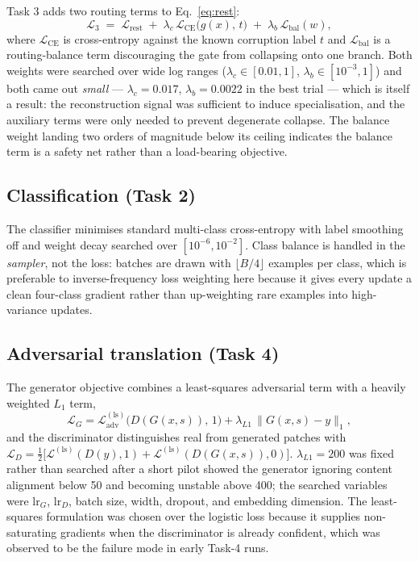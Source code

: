 \documentclass[journal]{IEEEtran}
\begin{document}
Task 3 adds two routing terms to Eq.~\eqref{eq:rest}:
\begin{equation}
\mathcal{L}_3 \;=\; \mathcal{L}_{\text{rest}} \;+\; \lambda_c\,\mathcal{L}_{\text{CE}}\!\big(g(x),\, t\big) \;+\; \lambda_b\,\mathcal{L}_{\text{bal}}(w),
\label{eq:task3}
\end{equation}
where $\mathcal{L}_{\text{CE}}$ is cross-entropy against the known corruption label $t$ and $\mathcal{L}_{\text{bal}}$ is a routing-balance term discouraging the gate from collapsing onto one branch. Both weights were searched over wide log ranges ($\lambda_c\in[0.01,1]$, $\lambda_b\in[10^{-3},1]$) and both came out \emph{small} --- $\lambda_c=0.017$, $\lambda_b=0.0022$ in the best trial --- which is itself a result: the reconstruction signal was sufficient to induce specialisation, and the auxiliary terms were only needed to prevent degenerate collapse. The balance weight landing two orders of magnitude below its ceiling indicates the balance term is a safety net rather than a load-bearing objective.

\subsection{Classification (Task 2)}

The classifier minimises standard multi-class cross-entropy with label smoothing off and weight decay searched over $[10^{-6},10^{-2}]$. Class balance is handled in the \emph{sampler}, not the loss: batches are drawn with $\lfloor B/4\rfloor$ examples per class, which is preferable to inverse-frequency loss weighting here because it gives every update a clean four-class gradient rather than up-weighting rare examples into high-variance updates.

\subsection{Adversarial translation (Task 4)}

The generator objective combines a least-squares adversarial term with a heavily weighted $L_1$ term,
\begin{equation}
\mathcal{L}_G = \mathcal{L}_{\text{adv}}^{(\text{ls})}\big(D(G(x,s)),\,1\big)
  + \lambda_{L1}\,\lVert G(x,s) - y \rVert_1 ,
\end{equation}
and the discriminator distinguishes real from generated patches with $\mathcal{L}_D=\tfrac12\big[\mathcal{L}^{(\text{ls})}(D(y),1)+\mathcal{L}^{(\text{ls})}(D(G(x,s)),0)\big]$. $\lambda_{L1}=200$ was fixed rather than searched after a short pilot showed the generator ignoring content alignment below 50 and becoming unstable above 400; the searched variables were $\mathrm{lr}_G$, $\mathrm{lr}_D$, batch size, width, dropout, and embedding dimension. The least-squares formulation was chosen over the logistic loss because it supplies non-saturating gradients when the discriminator is already confident, which was observed to be the failure mode in early Task-4 runs.
\end{document}
